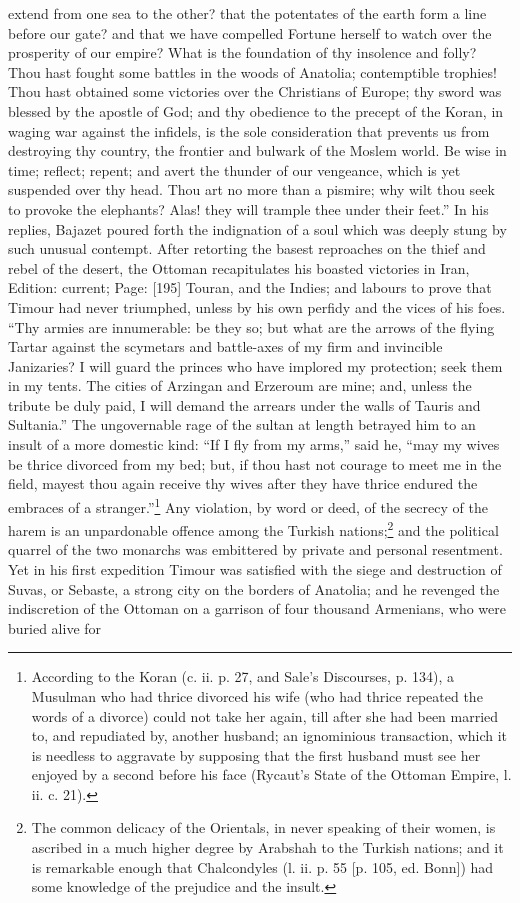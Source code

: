 extend from one sea to the other? that the potentates of the earth form a line before our gate? and that we have compelled Fortune herself to watch over the prosperity of our empire? What is the foundation of thy insolence and folly? Thou hast fought some battles in the woods of Anatolia; contemptible trophies! Thou hast obtained some victories over the Christians of Europe; thy sword was blessed by the apostle of God; and thy obedience to the precept of the Koran, in waging war against the infidels, is the sole consideration that prevents us from destroying thy country, the frontier and bulwark of the Moslem world. Be wise in time; reflect; repent; and avert the thunder of our vengeance, which is yet suspended over thy head. Thou art no more than a pismire; why wilt thou seek to provoke the elephants? Alas! they will trample thee under their feet.\texthebrew{}” In his replies, Bajazet poured forth the indignation of a soul which was deeply stung by such unusual contempt. After retorting the basest reproaches on the thief and rebel of the desert, the Ottoman recapitulates his boasted victories in Iran, Edition: current; Page: [195] Touran, and the Indies; and labours to prove that Timour had never triumphed, unless by his own perfidy and the vices of his foes. \texthebrew{“}Thy armies are innumerable: be they so; but what are the arrows of the flying Tartar against the scymetars and battle-axes of my firm and invincible Janizaries? I will guard the princes who have implored my protection; seek them in my tents. The cities of Arzingan and Erzeroum are mine; and, unless the tribute be duly paid, I will demand the arrears under the walls of Tauris and Sultania.\texthebrew{}” The ungovernable rage of the sultan at length betrayed him to an insult of a more domestic kind: \texthebrew{“}If I fly from my arms,\texthebrew{}” said he, \texthebrew{“}may my wives be thrice divorced from my bed; but, if thou hast not courage to meet me in the field, mayest thou again receive thy wives after they have thrice endured the embraces of a stranger.\texthebrew{}”\footnote{According to the Koran (c. ii. p. 27, and Sale\texthebrew{}’s Discourses, p. 134), a Musulman who had thrice divorced his wife (who had thrice repeated the words of a divorce) could not take her again, till after she had been married to, and repudiated by, another husband; an ignominious transaction, which it is needless to aggravate by supposing that the first husband must see her enjoyed by a second before his face (Rycaut\texthebrew{}’s State of the Ottoman Empire, l. ii. c. 21).} Any violation, by word or deed, of the secrecy of the harem is an unpardonable offence among the Turkish nations;\footnote{The common delicacy of the Orientals, in never speaking of their women, is ascribed in a much higher degree by Arabshah to the Turkish nations; and it is remarkable enough that Chalcondyles (l. ii. p. 55 [p. 105, ed. Bonn]) had some knowledge of the prejudice and the insult.} and the political quarrel of the two monarchs was embittered by private and personal resentment. Yet in his first expedition Timour was satisfied with the siege and destruction of Suvas, or Sebaste, a strong city on the borders of Anatolia; and he revenged the indiscretion of the Ottoman on a garrison of four thousand Armenians, who were buried alive for 